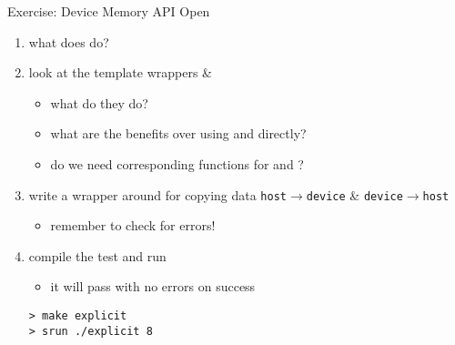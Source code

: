 \documentclass[aspectratio=43]{beamer}
\begin{document}
\begin{frame}[fragile]{Exercise: Device Memory API}
    Open 
    \begin{enumerate}
        \item what does  do?
        \item look at the template wrappers  \& 
        \begin{itemize}
            \item what do they do?
            \item what are the benefits over using  and  directly?
            \item do we need corresponding functions for  and ?
        \end{itemize}

        \item write a wrapper around  for copying data \texttt{host$\rightarrow$device} \& \texttt{device$\rightarrow$host}
        \begin{itemize}
            \item remember to check for errors!
        \end{itemize}

        \item compile the test and run
        \begin{itemize}
            \item it will pass with no errors on success
        \end{itemize}

    \vspace{-5pt}
\begin{terminal}{}
\begin{lstlisting}[style=terminal]
> make explicit
> srun ./explicit 8
\end{lstlisting}
\end{terminal}
    \end{enumerate}

\end{frame}
\end{document}

